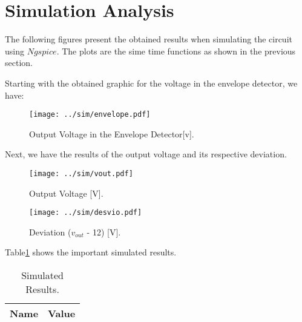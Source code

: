 \section{Simulation Analysis}
\label{sec:simulation}

\par The following figures present the obtained results when simulating the circuit using $Ngspice$. The plots are the sime time functions as shown in the previous section.

\par Starting with the obtained graphic for the voltage in the envelope detector, we have:

\begin{figure}[h] \centering
\texttt{[image: ../sim/envelope.pdf]}
\caption{Output Voltage in the Envelope Detector[v].}
\label{fig:venvelopes}
\end{figure}

\newpage

\par Next, we have the results of the output voltage and its respective deviation.

\begin{figure}[h] \centering
\texttt{[image: ../sim/vout.pdf]}
\caption{Output Voltage [V].}
\label{fig:vouts}
\end{figure}

\newpage

\begin{figure}[h] \centering
\texttt{[image: ../sim/desvio.pdf]}
\caption{Deviation ($v_{out}$ - 12) [V].}
\label{fig:deviations}
\end{figure}

\newpage


\par Table\ref{tab:data_s} shows the important simulated results.

\begin{table}[h]
  \centering
  \begin{tabular}{|l|r|}
    \hline    
    {\bf Name} & {\bf Value}\\ \hline
    
  \end{tabular}
  \caption{Simulated Results.}
  \label{tab:data_s}
\end{table}

\newpage

